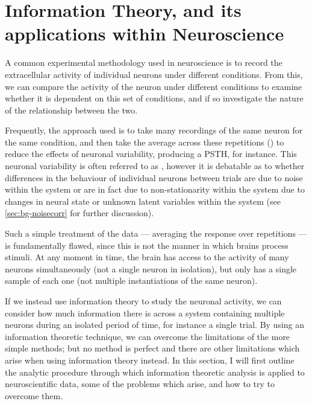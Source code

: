 \FloatBarrier
{}
\section{Information Theory, and its applications within Neuroscience}
\label{sec:bgit}

A common experimental methodology used in neuroscience is to record the extracellular activity of individual neurons under different conditions.
From this, we can compare the activity of the neuron under different conditions to examine whether it is dependent on this set of conditions, and if so investigate the nature of the relationship between the two.

Frequently, the approach used is to take many recordings of the same neuron for the same condition, and then take the average across these repetitions () to reduce the effects of neuronal variability, producing a \ac{PSTH}, for instance.
This neuronal variability is often referred to as , however it is debatable as to whether differences in the behaviour of individual neurons between trials are due to noise within the system or are in fact due to non-stationarity within the system due to changes in neural state or unknown latent variables within the system (see \autoref{sec:bg-noisecorr} for further discussion).

Such a simple treatment of the data --- averaging the response over repetitions --- is fundamentally flawed, since this is not the manner in which brains process stimuli.
At any moment in time, the brain has access to the activity of many neurons simultaneously (not a single neuron in isolation), but only has a single sample of each one (not multiple instantiations of the same neuron).

If we instead use information theory to study the neuronal activity, we can consider how much information there is across a system containing multiple neurons during an isolated period of time, for instance a single trial.
By using an information theoretic technique, we can overcome the limitations of the more simple methods; but no method is perfect and there are other limitations which arise when using information theory instead.
In this section, I will first outline the analytic procedure through which information theoretic analysis is applied to neuroscientific data, some of the problems which arise, and how to try to overcome them.


